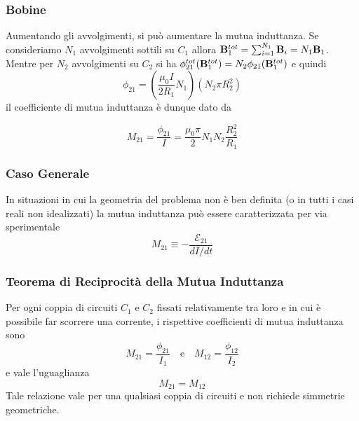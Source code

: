 \subsubsection{Bobine}

Aumentando gli avvolgimenti, si pu\`o aumentare la mutua induttanza. Se consideriamo $N_1$ avvolgimenti sottili su $C_1$ allora $\bold{B}_{1}^{tot} = \sum_{i=1}^{N_1}\bold{B}_i = N_1 \bold{B}_{1}$. Mentre per $N_2$ avvolgimenti su $C_2$ si ha $\phi_{21}^{tot}(\bold{B}_1^{tot}) = N_2 \phi_{21}(\bold{B}_1^{tot})$ e quindi 
\begin{equation*}
	\phi_{21} = \left( \frac{\mu_0 I}{2R_1}N_1 \right)\left(N_2 \pi R_2^2\right)
\end{equation*}
il coefficiente di mutua induttanza \`e dunque dato da 

\begin{equation*}
	M_{21} = \frac{\phi_{21}}{I} = \frac{\mu_0 \pi}{2}N_1N_2\frac{R_2^2}{R_1}
\end{equation*}

\subsubsection{Caso Generale}

In situazioni in cui la geometria del problema non \`e ben definita (o in tutti i casi reali non idealizzati) la mutua induttanza pu\`o essere caratterizzata per via sperimentale 
\begin{equation}
	M_{21} \equiv  - \frac{\mathcal{E}_{21}}{dI/dt}
\end{equation}

\subsubsection{Teorema di Reciprocit\`a della Mutua Induttanza}



Per ogni coppia di circuiti $C_1$ e $C_2$ fissati relativamente tra loro e in cui \`e possibile far scorrere una corrente, i rispettive coefficienti di mutua induttanza sono
\begin{equation*}
	M_{21} = \frac{\phi_{21}}{I_1} \quad \text{e} \quad M_{12} = \frac{\phi_{12}}{I_2}
\end{equation*}
e vale l'uguaglianza 
\begin{equation}
	M_{21} = M_{12}
\end{equation}
Tale relazione vale per una qualsiasi coppia di circuiti e non richiede simmetrie geometriche.

